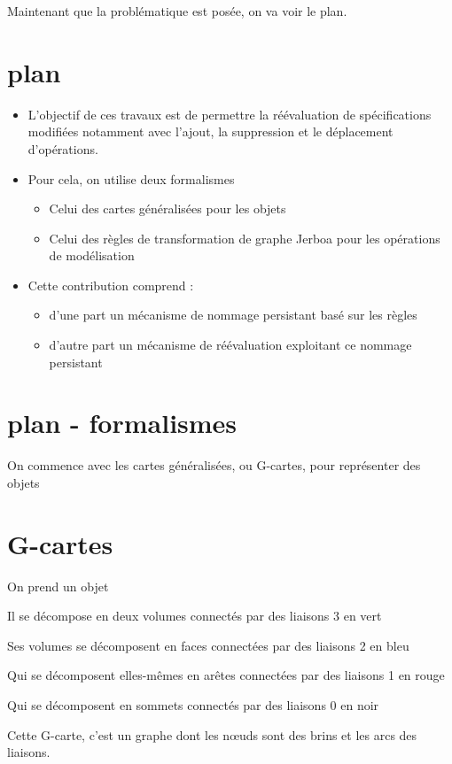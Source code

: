 \documentclass[11pt]{article}
\begin{document}
Maintenant que la problématique est posée, on va voir le plan.

\section{plan}
\label{sec:orgdf64a4e}
\begin{itemize}
	\item L'objectif de ces travaux est de permettre la réévaluation de
spécifications modifiées notamment avec l'ajout, la suppression et le
déplacement d'opérations.
	\item Pour cela, on utilise deux formalismes
	      \begin{itemize}
		      \item Celui des cartes généralisées pour les objets
		      \item Celui des règles de transformation de graphe Jerboa pour les
opérations de modélisation
	      \end{itemize}
	\item Cette contribution comprend :
	      \begin{itemize}
		      \item d'une part un mécanisme de nommage persistant basé sur les
règles
		      \item d'autre part un mécanisme de réévaluation exploitant ce
nommage persistant
	      \end{itemize}
\end{itemize}
\section{plan - formalismes}
\label{sec:orgfbb8259}

On commence avec les cartes généralisées, ou G-cartes, pour représenter des
objets
\section{G-cartes}
\label{sec:orgf33c57b} On prend un objet

Il se décompose en deux volumes connectés par des liaisons 3 en vert

Ses volumes se décomposent en faces connectées par des liaisons 2 en bleu

Qui se décomposent elles-mêmes en arêtes connectées par des liaisons 1 en rouge

Qui se décomposent en sommets connectés par des liaisons 0 en noir

Cette G-carte, c'est un graphe dont les nœuds sont des brins et les arcs des
liaisons.
\end{document}
